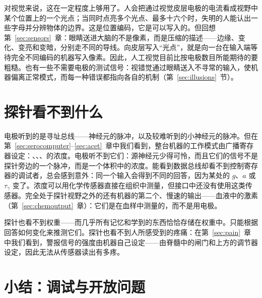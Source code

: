 对视觉来说，这在一定程度上够用了。人会把通过视觉皮层电极的电流看成视野中某个位置上的一个光点；当同时点亮多个光点、最多十六个时，失明的人能认出一些字母并分辨物体的边界\cite{Fernandez2021}。这是位置编码，它是可以写入的。但回想第~\ref{sec:sensors}~章：眼睛送进大脑的不是像素，而是压缩的描述——边缘、变化、变亮和变暗，分别走不同的导线。向皮层写入“光点”，就是向一台在输入端等待完全不同编码的机器写入像素。因此，人工视觉目前比按电极数目所能期待的要粗糙。也有一些不需要电极的测试信号：视错觉通过眼睛送入不寻常的输入，使机器偏离正常模式，而每一种错误都指向各自的机制（第~\ref{sec:illusions}~节）。

\section{探针看不到什么}

电极听到的是寻址总线——神经元的脉冲，以及较难听到的小神经元的脉冲。但在第~\ref{sec:serocomputer}--\ref{sec:acet}~章中我们看到，整台机器的工作模式由广播寄存器设定：、、、的浓度。电极听不到它们：源神经元少得可怜，而且它们的信号不是探针旁边的一个脉冲，而是一个体积中的浓度。能看到数据总线却看不到控制寄存器的调试者，总会感到意外：同一个输入会得到不同的回答，因为某处的 $g$、$a$ 或 $\tau_\gamma$ 变了。浓度可以用化学传感器直接在组织中测量\cite{Bunin1998}，但接口中还没有使用这类传感器。完全处于探针视野之外的还有机器的第二个、慢速的输出——血液中的激素（第~\ref{sec:chemoutput}~章）：它们是在血样中测量的，而不是用电极。

探针也看不到权重——而几乎所有记忆和学到的东西恰恰存储在权重中。只能根据回答如何变化来推测它们。探针也看不到人所感受到的疼痛：在第~\ref{sec:pain}~章中我们看到，警报信号的强度由机器自己设定——由脊髓中的闸门和上方的调节器设定，因此无法从传感器读出有多疼。

\section{小结：调试与开放问题}

